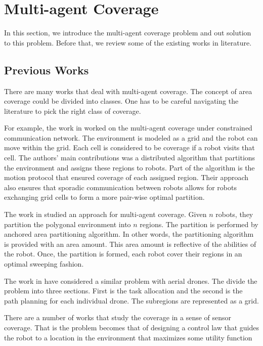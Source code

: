 \documentclass[../main.tex]{subfiles}
\begin{document}
\chapter{Multi-agent Coverage}
\label{chapter:multi-agent_coverage}

In this section, we introduce the multi-agent coverage problem and out solution to this problem. Before that, we review some of the existing works in literature.


\section{Previous Works}
\label{sec:multi-agent_previous_works}
There are many works that deal with multi-agent coverage. The concept of area coverage could be divided into classes. One has to be careful navigating the literature to pick the right class of coverage.

For example, the work in\cite{durham2012discrete} worked on the multi-agent coverage under constrained communication network. The environment is modeled as a grid and the robot can move within the grid. Each cell is considered to be coverage if a robot visits that cell. The authors' main contributions was a distributed algorithm that partitions the environment and assigns these regions to robots. Part of the algorithm is the motion protocol that ensured coverage of each assigned region. Their approach also ensures that sporadic communication between robots allows for robots exchanging grid cells to form a more pair-wise optimal partition.

The work in \cite{maza2007multiple} studied an approach for multi-agent coverage. Given $n$ robots, they partition the polygonal environment into $n$ regions. The partition is performed by anchored area partitioning algorithm. In other words, the partitioning algorithm is provided with an area amount. This area amount is reflective of the abilities of the robot. Once, the partition is formed, each robot cover their regions in an optimal sweeping fashion.

The work in \cite{barrientos2011aerial} have considered a similar problem with aerial drones. The divide the problem into three sections. First is the task allocation and the second is the path planning for each individual drone. The subregions are represented as a grid.

There are a number of works that study the coverage in a sense of sensor coverage. That is the problem becomes that of designing a control law that guides the robot to a location in the environment that maximizes some utility function%
\end{document}
